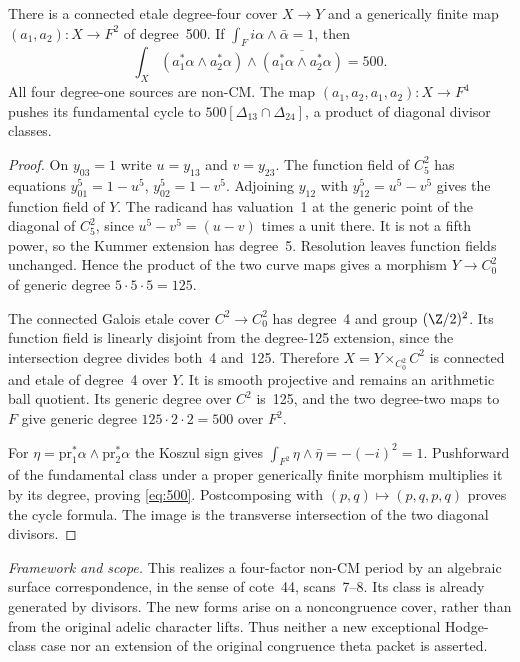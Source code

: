 \documentclass[11pt]{article}
\newcommand{\framework}[1]{\par\smallskip\noindent\textit{Framework and scope.} #1\par}
\theoremstyle{definition}\newtheorem{definition}[theorem]{Definition}\newtheorem{remark}[theorem]{Remark}
\begin{document}
There is a connected etale degree-four cover $X\to Y$ and a generically finite map $(a_1,a_2):X\to F^2$ of degree~500. If
$\int_F i\alpha\wedge\bar\alpha=1$, then
\begin{equation}\label{eq:500}
 \int_X(a_1^*\alpha\wedge a_2^*\alpha)
 \wedge\overline{(a_1^*\alpha\wedge a_2^*\alpha)}=500.
\end{equation}
All four degree-one sources are non-CM. The map
$(a_1,a_2,a_1,a_2):X\to F^4$ pushes its fundamental cycle to
$500[\Delta_{13}\cap\Delta_{24}]$, a product of diagonal divisor classes.
\begin{proof}
On $y_{03}=1$ write $u=y_{13}$ and $v=y_{23}$. The function field of $C_5^2$ has equations
$y_{01}^5=1-u^5$, $y_{02}^5=1-v^5$. Adjoining $y_{12}$ with
$y_{12}^5=u^5-v^5$ gives the function field of $Y$. The radicand has valuation~1 at the generic point of the diagonal of $C_5^2$, since $u^5-v^5=(u-v)$ times a unit there. It is not a fifth power, so the Kummer extension has degree~5. Resolution leaves function fields unchanged. Hence the product of the two curve maps gives a morphism $Y\to C_0^2$ of generic degree $5\cdot5\cdot5=125$.

The connected Galois etale cover $C^2\to C_0^2$ has degree~4 and group $(\Z/2)^2$. Its function field is linearly disjoint from the degree-125 extension, since the intersection degree divides both~4 and~125. Therefore
$X=Y\times_{C_0^2}C^2$ is connected and etale of degree~4 over $Y$. It is smooth projective and remains an arithmetic ball quotient. Its generic degree over $C^2$ is~125, and the two degree-two maps to $F$ give generic degree $125\cdot2\cdot2=500$ over $F^2$.

For $\eta=\mathrm{pr}_1^*\alpha\wedge\mathrm{pr}_2^*\alpha$ the Koszul sign gives
$\int_{F^2}\eta\wedge\bar\eta=-(-i)^2=1$.
Pushforward of the fundamental class under a proper generically finite morphism multiplies it by its degree, proving \eqref{eq:500}. Postcomposing with $(p,q)\mapsto(p,q,p,q)$ proves the cycle formula. The image is the transverse intersection of the two diagonal divisors.
\end{proof}
\framework{This realizes a four-factor non-CM period by an algebraic surface correspondence, in the sense of cote~44, scans~7--8. Its class is already generated by divisors. The new forms arise on a noncongruence cover, rather than from the original adelic character lifts. Thus neither a new exceptional Hodge-class case nor an extension of the original congruence theta packet is asserted.}
\end{document}

